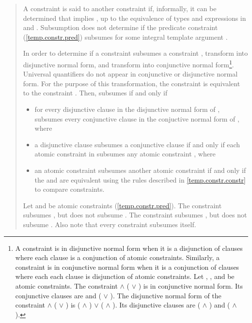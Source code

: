 \begin{quote}
\pnum
A constraint  is said to  another constraint  
if, informally, it can be determined that  implies , up to 
the equivalence of types and expressions in  and .
% 
\enterexample
Subsumption does not determine if the predicate constraint 
(\ref{temp.constr.pred})  subsumes  for some 
integral template argument .
\exitexample


\pnum
In order to determine if a constraint  subsumes a constraint
, transform  into disjunctive normal form, 
and transform  into conjunctive normal form\footnote{
A constraint is in disjunctive normal form when it is a disjunction of
clauses where each clause is a conjunction of atomic constraints. 
% 
Similarly, a constraint is in conjunctive normal form when it is a conjunction 
of clauses where each each clause is disjunction of atomic constraints.
% 
\enterexample
Let , , and  be atomic constraints.
% 
The constraint  $\land$ ( $\lor$ ) is in 
conjunctive normal form.
% 
Its conjunctive clauses are  and ( $\lor$ ).
% 
The disjunctive normal form of the constraint
 $\land$ ( $\lor$ ) 
is
( $\land$ ) $\lor$ ( $\land$ ).
% 
Its disjunctive clauses are ( $\land$ ) and 
( $\land$ ).
\exitexample
}.
% 
Universal quantifiers do not appear in conjunctive or disjunctive normal
form. For the purpose of this transformation, the constraint
 is equivalent to the constraint .
% 
Then,  subsumes  if and only if
\begin{itemize}
\item for every disjunctive clause  in the disjunctive normal 
form of ,  subsumes every conjunctive clause  
in the conjuctive normal form of , where

\item a disjunctive clause  subsumes a conjunctive clause
 if and only if each atomic constraint in  subsumes 
any atomic constraint , where

\item an atomic constraint  subsumes another atomic constraint
 if and only if the  and  are equivalent using the
rules described in \ref{temp.constr.constr} to compare constraints.
\end{itemize}
% 
\enterexample
Let  and  be atomic constraints (\ref{temp.constr.pred}).
% 
The constraint  subsumes , 
but  does not subsume . 
% 
The constraint  subsumes , but
 does not subsume . 
% 
Also note that every constraint subsumes itself.
\exitexample



\end{quote}
